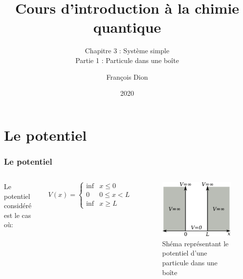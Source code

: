 \documentclass{beamer}
\title{Cours d'introduction à la chimie quantique}
\subtitle{Chapitre 3 : Système simple\\Partie 1 : Particule dans une boîte}
\author{François Dion}
\date{2020}
\begin{document}
\frame{\titlepage}




\section{Le potentiel}
\begin{frame}
\frametitle{Le potentiel}
\begin{columns}
Le potentiel considéré est le cas où:


\begin{equation} \tag{1}
V(x)=\left\{\begin{array}{cc} \inf & x\leq 0 \\
     0 & 0\leq x < L \\
      \inf & x \geq L 
  \end{array} \right. \label{eq2}
\end{equation} 
\begin{figure}
\includegraphics[scale=0.4]{Pot}
\caption{Shéma représentant le potentiel d'une particule dans une boîte}
\end{figure}
\end{columns}
\end{frame}
\end{document}
